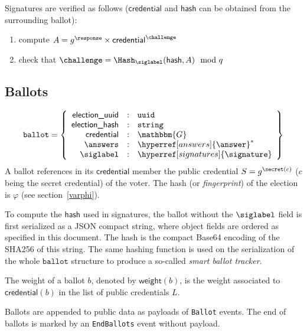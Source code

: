 \documentclass[a4paper]{article}
\newcommand{\G}{\mathbbm{G}}
\newcommand{\jstring}{\texttt{string}}
\newcommand{\uuid}{\texttt{uuid}}
\newcommand{\ballot}{\texttt{ballot}}
\begin{document}
Signatures are verified as follows ($\textsf{credential}$ and
$\textsf{hash}$ can be obtained from the surrounding ballot):
\begin{enumerate}
\item compute $A=g^\response\times \textsf{credential}^\challenge$
\item check that $\challenge=\Hash_\siglabel(\textsf{hash},A)\mod q$
\end{enumerate}

\subsection{Ballots}
\label{ballots}

\newcommand{\json}{\textsf{JSON}}

\begin{gather*}
  \ballot=\left\{
    \begin{array}{rcl}
      \textsf{election\_uuid}&:&\uuid\\
      \textsf{election\_hash}&:&\jstring\\
      \textsf{credential}&:&\G\\
      \answers&:&\hyperref[answers]{\answer}^\ast\\
      \siglabel&:&\hyperref[signatures]{\signature}
    \end{array}
  \right\}
\end{gather*}
A ballot references in its $\textsf{credential}$ member the public
credential $S=g^{\secret(c)}$ ($c$ being the secret credential) of the
voter. The hash (or \emph{fingerprint}) of the election is $\varphi$ (see
section~\ref{varphi}).

To compute the $\textsf{hash}$ used in signatures, the ballot without
the $\siglabel$ field is first serialized as a JSON compact string,
where object fields are ordered as specified in this document. The
hash is the compact Base64 encoding of the SHA256 of this string.
The same hashing function is used on the serialization of the whole
$\ballot$ structure to produce a so-called \emph{smart ballot
  tracker}.

The weight of a ballot $b$, denoted by $\textsf{weight}(b)$, is the
weight associated to $\textsf{credential}(b)$ in the list of public
credentials $L$.

Ballots are appended to public data as payloads of \texttt{Ballot}
events. The end of ballots is marked by an \texttt{EndBallots} event
without payload.
\end{document}
